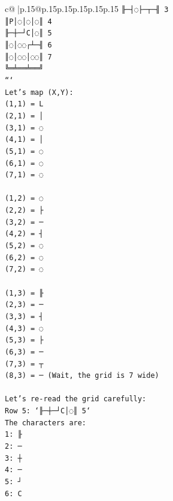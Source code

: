 \documentclass{article}
\begin{document}
{\begin{supertabular}{c@{$\;$}|p{.15\linewidth}@{}p{.15\linewidth}p{.15\linewidth}p{.15\linewidth}p{.15\linewidth}p{.15\linewidth}}
{{{\texttt{╟─┤◌├─┬─╢ 3} \\
\texttt{║P│◌│◌│◌║ 4} \\
\texttt{╟─┼─┘C│◌║ 5} \\
\texttt{║◌│◌◌┌┴─╢ 6} \\
\texttt{║◌│◌◌│◌◌║ 7} \\
\texttt{╚═╧══╧══╝} \\
\texttt{```} \\
\texttt{Let's map (X,Y):} \\
\texttt{(1,1) = L} \\
\texttt{(2,1) = │} \\
\texttt{(3,1) = ◌} \\
\texttt{(4,1) = │} \\
\texttt{(5,1) = ◌} \\
\texttt{(6,1) = ◌} \\
\texttt{(7,1) = ◌} \\
\\ 
\texttt{(1,2) = ◌} \\
\texttt{(2,2) = ├} \\
\texttt{(3,2) = ─} \\
\texttt{(4,2) = ┤} \\
\texttt{(5,2) = ◌} \\
\texttt{(6,2) = ◌} \\
\texttt{(7,2) = ◌} \\
\\ 
\texttt{(1,3) = ╟} \\
\texttt{(2,3) = ─} \\
\texttt{(3,3) = ┤} \\
\texttt{(4,3) = ◌} \\
\texttt{(5,3) = ├} \\
\texttt{(6,3) = ─} \\
\texttt{(7,3) = ┬} \\
\texttt{(8,3) = ─ (Wait, the grid is 7 wide)} \\
\\ 
\texttt{Let's re{-}read the grid carefully:} \\
\texttt{Row 5: `╟─┼─┘C│◌║ 5`} \\
\texttt{The characters are:} \\
\texttt{1: ╟} \\
\texttt{2: ─} \\
\texttt{3: ┼} \\
\texttt{4: ─} \\
\texttt{5: ┘} \\
\texttt{6: C} \\
}}}
\end{supertabular}}
\end{document}
